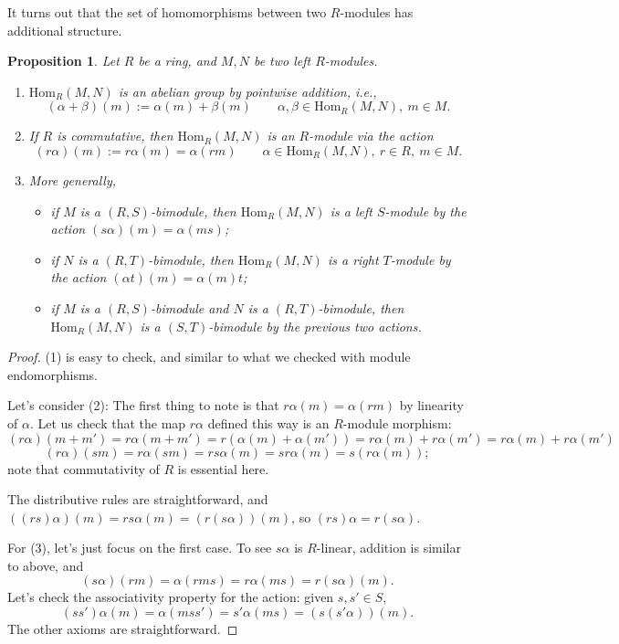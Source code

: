 \documentclass{amsart}[12pt]
\newcommand{\Hom}{\mathrm{Hom}}
\numberwithin{equation}{section}
\theoremstyle{plain} %
\newtheorem{prop}[equation]{Proposition}
\theoremstyle{definition}
\theoremstyle{remark}
\begin{document}
It turns out that the set of homomorphisms between two $R$-modules has additional structure.

\begin{prop}
Let $R$ be a ring, and $M,N$ be two left $R$-modules.
\begin{enumerate}
\item $\Hom_R(M,N)$ is an abelian group by pointwise addition, i.e.,
\[ (\alpha+\beta)(m) := \alpha(m) + \beta(m)  \qquad \alpha,\beta\in\Hom_R(M,N),\ m\in M.\]
\item If $R$ is commutative, then $\Hom_R(M,N)$ is an $R$-module via the action
\[ (r\alpha) (m) := r \alpha(m) = \alpha(rm) \qquad \alpha\in \Hom_R(M,N),\ r\in R, \ m\in M.\]
\item More generally, 
\begin{itemize}
\item if $M$ is a $(R,S)$-bimodule, then $\Hom_R(M,N)$ is a left $S$-module by the action $(s \alpha)(m) = \alpha(ms)$;
\item if $N$ is a $(R,T)$-bimodule, then $\Hom_R(M,N)$ is a right $T$-module by the action $(\alpha t)(m)=\alpha(m)t$;
\item if $M$ is a $(R,S)$-bimodule and $N$ is a $(R,T)$-bimodule, then $\Hom_R(M,N)$ is a $(S,T)$-bimodule by the previous two actions.
\end{itemize}
\end{enumerate}
\end{prop}

\begin{proof}
(1) is easy to check, and similar to what we checked with module endomorphisms.

Let's consider (2): The first thing to note is that $r\alpha(m)=\alpha(rm)$ by linearity of $\alpha$. Let us check that the map $r\alpha$ defined this way is an $R$-module morphism:
\[ (r\alpha)(m+m') = r \alpha(m+m') = r(\alpha(m) +\alpha(m'))=r\alpha(m) +r\alpha(m') = r\alpha(m) + r\alpha(m')\]
\[ (r\alpha)(sm)= r \alpha(sm) = rs \alpha(m) = sr \alpha(m) = s (r\alpha(m));\]
note that commutativity of $R$ is essential here.

The distributive rules are straightforward, and $((rs) \alpha)(m) = rs\alpha(m) = (r(s\alpha))(m)$, so $(rs)\alpha=r(s\alpha)$.

For (3), let's just focus on the first case. To see $s\alpha$ is $R$-linear, addition is similar to above, and
\[ (s\alpha)(rm) = \alpha(rms) = r\alpha(ms) = r (s\alpha)(m).\]
Let's check the associativity property for the action: given $s,s'\in S$, \[(s s')\alpha(m) = \alpha(m s s') = s' \alpha(m s) = (s(s' \alpha))(m).\]
The other axioms are straightforward.
\end{proof}
\end{document}
